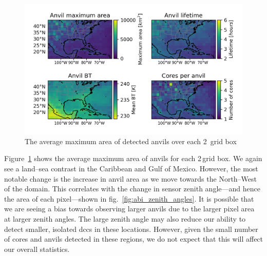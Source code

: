 \begin{figure}[tp]
    \centering
    \includegraphics[width=\textwidth]{figures/chapter2_19.png}
    \caption[
    The average maximum area of detected anvils
    ]{
    The average maximum area of detected anvils over each 2\textdegree\ grid box
    }
    \label{fig:anvil_area_map}
\end{figure}

Figure~\ref{fig:anvil_area_map} shows the average maximum area of anvils for each 2\,\textdegree grid box.
We again see a land--sea contrast in the Caribbean and Gulf of Mexico.
However, the most notable change is the increase in anvil area as we move towards the North--West of the domain.
This correlates with the change in sensor zenith angle---and hence the area of each pixel---shown in fig.~\ref{fig:abi_zenith_angles}.
It is possible that we are seeing a bias towards observing larger anvils due to the larger pixel area at larger zenith angles.
The large zenith angle may also reduce our ability to detect smaller, isolated \acrshort{dcc}s in these locations. 
However, given the small number of cores and anvils detected in these regions, we do not expect that this will affect our overall statistics.

